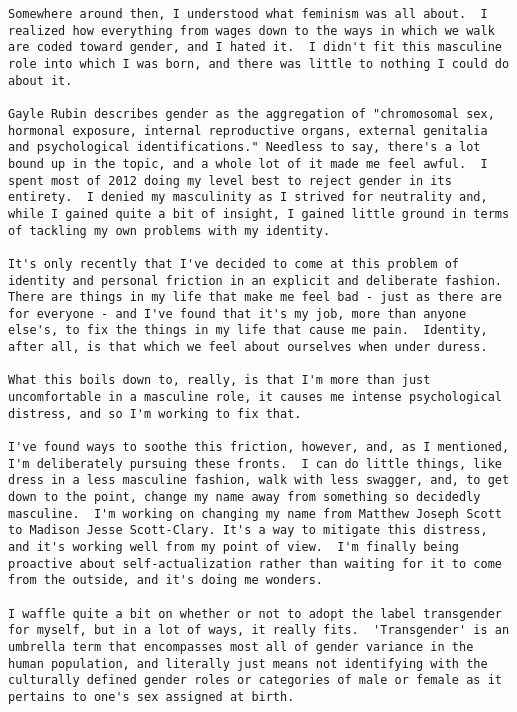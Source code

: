 \begin{verbatim}
Somewhere around then, I understood what feminism was all about.  I realized how everything from wages down to the ways in which we walk are coded toward gender, and I hated it.  I didn't fit this masculine role into which I was born, and there was little to nothing I could do about it.

Gayle Rubin describes gender as the aggregation of "chromosomal sex, hormonal exposure, internal reproductive organs, external genitalia and psychological identifications." Needless to say, there's a lot bound up in the topic, and a whole lot of it made me feel awful.  I spent most of 2012 doing my level best to reject gender in its entirety.  I denied my masculinity as I strived for neutrality and, while I gained quite a bit of insight, I gained little ground in terms of tackling my own problems with my identity.

It's only recently that I've decided to come at this problem of identity and personal friction in an explicit and deliberate fashion.  There are things in my life that make me feel bad - just as there are for everyone - and I've found that it's my job, more than anyone else's, to fix the things in my life that cause me pain.  Identity, after all, is that which we feel about ourselves when under duress.

What this boils down to, really, is that I'm more than just uncomfortable in a masculine role, it causes me intense psychological distress, and so I'm working to fix that.

I've found ways to soothe this friction, however, and, as I mentioned, I'm deliberately pursuing these fronts.  I can do little things, like dress in a less masculine fashion, walk with less swagger, and, to get down to the point, change my name away from something so decidedly masculine.  I'm working on changing my name from Matthew Joseph Scott to Madison Jesse Scott-Clary. It's a way to mitigate this distress, and it's working well from my point of view.  I'm finally being proactive about self-actualization rather than waiting for it to come from the outside, and it's doing me wonders.

I waffle quite a bit on whether or not to adopt the label transgender for myself, but in a lot of ways, it really fits.  'Transgender' is an umbrella term that encompasses most all of gender variance in the human population, and literally just means not identifying with the culturally defined gender roles or categories of male or female as it pertains to one's sex assigned at birth.


\end{verbatim}
